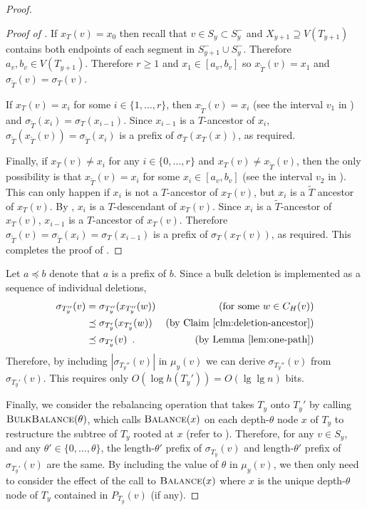 \documentclass[kpfonts]{patmorin}
\begin{document}
\begin{proof}
\begin{proof}[Proof of ]
    If $x_T(v)=x_0$ then recall that $v\in S_y\subset S^-_y$ and $X_{y+1}\supseteq V(T_{y+1})$ contains both endpoints of each segment in $S^-_{y+1}\cup S^-_y$.  Therefore $a_v,b_v\in V(T_{y+1})$.  Therefore $r\ge 1$ and $x_1\in [a_v,b_v]$ so $x_{\tilde{T}}(v)=x_1$ and $\sigma_{\tilde{T}}(v)=\sigma_T(v)$.
    
    If $x_T(v)=x_i$ for some $i\in\{1,\ldots,r\}$, then $x_{\tilde{T}}(v)=x_i$ (see the interval $v_1$ in ) and $\sigma_{\tilde{T}}(x_i)=\sigma_{T}(x_{i-1})$.  Since $x_{i-1}$ is a $T$-ancestor of $x_i$, $\sigma_{\tilde{T}}(x_{\tilde{T}}(v))=\sigma_{\tilde{T}}(x_i)$ is a prefix of $\sigma_{T}(x_{T}(x))$, as required.
    
    Finally, if $x_T(v)\neq x_i$ for any $i\in\{0,\ldots,r\}$ and $x_T(v)\neq x_{\tilde{T}}(v)$, then the only possibility is that $x_{\tilde{T}}(v)=x_i$ for some $x_i\in [a_v,b_v]$ (see the interval $v_2$ in ).  This can only happen if $x_i$ is not a $T$-ancestor of $x_T(v)$, but $x_i$ is a $\tilde{T}$ ancestor of $x_T(v)$.  By , $x_i$ is a $T$-descendant of $x_T(v)$.  Since $x_i$ is a $\tilde{T}$-ancestor of $x_T(v)$, $x_{i-1}$ is a $T$-ancestor of $x_T(v)$.  Therefore $\sigma_{\tilde{T}}(v)=\sigma_{\tilde{T}}(x_i)=\sigma_T(x_{i-1})$ is a prefix of $\sigma_T(x_T(v))$, as required.  This completes the proof of .    
  \end{proof}
  
  Let $a\preceq b$ denote that $a$ is a prefix of $b$.
  Since a bulk deletion is implemented as a sequence of individual deletions,
  \begin{align*}
    \sigma_{T_y''}(v) 
      & = \sigma_{T_y''}(x_{T_y''}(w)) & \text{(for some $w\in C_H(v)$)} \\
      & \preceq \sigma_{T_y'}(x_{T_y'}(w)) & \text{(by \clmref{deletion-ancestor})} \\
      & \preceq \sigma_{T_y'}(v) \enspace . & \text{(by \lemref{one-path})}
  \end{align*} 
  Therefore, by including $|\sigma_{T_y''}(v)|$ in $\mu_y(v)$ we can derive $\sigma_{T_y''}(v)$ from $\sigma_{T_y'}(v)$.  This requires only $O(\log h({T_y'}))=O(\lg\lg n)$ bits.
  
  Finally, we consider the rebalancing operation that takes $T_y$ onto $T_y'$ by calling $\textsc{BulkBalance}(\theta)$, which calls $\textsc{Balance}(x)$ on each depth-$\theta$ node $x$ of $T_y$ to restructure the subtree of $T_y$ rooted at $x$ (refer to ). Therefore, for any $v\in S_y$, and any $\theta'\in\{0,\ldots,\theta\}$, the length-$\theta'$ prefix of $\sigma_{T_y}(v)$ and length-$\theta'$ prefix of $\sigma_{T_y'}(v)$ are the same.  By including the value of $\theta$ in $\mu_y(v)$, we then only need to consider the effect of the call to $\textsc{Balance}(x)$ where $x$ is the unique depth-$\theta$ node of $T_y$ contained in $P_{T_y}(v)$ (if any).
  

\end{proof}
\end{document}
